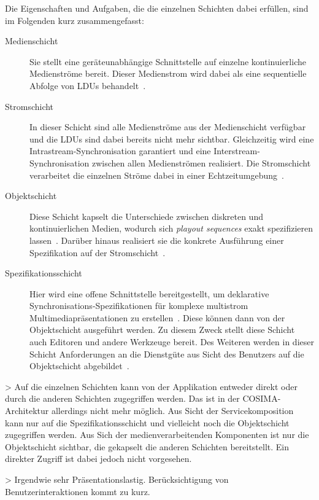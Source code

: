   Die Eigenschaften und Aufgaben, die die einzelnen Schichten dabei erfüllen, sind im Folgenden kurz zusammengefasst:
  
  \begin{description}
    \item[Medienschicht] Sie stellt eine geräteunabhängige Schnittstelle auf einzelne kontinuierliche Medienströme bereit. Dieser Medienstrom wird dabei als eine sequentielle Abfolge von LDUs behandelt~\citep[S. 603]{multimedia_technologie}.
    \item[Stromschicht] In dieser Schicht sind alle Medienströme aus der Medienschicht verfügbar und die LDUs sind dabei bereits nicht mehr sichtbar. Gleichzeitig wird eine Intrastream-Synchronisation garantiert und eine Interstream-Synchronisation zwischen allen Medienströmen realisiert. Die Stromschicht verarbeitet die einzelnen Ströme dabei in einer Echtzeitumgebung~\citep[S. 604]{multimedia_technologie}.
    \item[Objektschicht] Diese Schicht kapselt die Unterschiede zwischen diskreten und kontinuierlichen Medien, wodurch sich \emph{playout sequences} exakt spezifizieren lassen~\citep[S. 99]{meyer1993tms}. Darüber hinaus realisiert sie die konkrete Ausführung einer Spezifikation auf der Stromschicht~\citep[S. 605]{multimedia_technologie}.
    \item[Spezifikationsschicht] Hier wird eine offene Schnittstelle bereitgestellt, um deklarative Synchronisations-Spezifikationen für komplexe multistrom Multimediapräsentationen zu erstellen~\citep[S. 13]{blakowski1996mss}. Diese können dann von der Objektschicht ausgeführt werden. Zu diesem Zweck stellt diese Schicht auch Editoren und andere Werkzeuge bereit. Des Weiteren werden in dieser Schicht Anforderungen an die Dienstgüte aus Sicht des Benutzers auf die Objektschicht abgebildet~\citep[S. 607]{multimedia_technologie}.
  \end{description}
  
  > Auf die einzelnen Schichten kann von der Applikation entweder direkt oder durch die anderen Schichten zugegriffen werden. Das ist in der COSIMA-Architektur allerdings nicht mehr möglich. Aus Sicht der Servicekomposition kann nur auf die Spezifikationsschicht und vielleicht noch die Objektschicht zugegriffen werden. Aus Sich der medienverarbeitenden Komponenten ist nur die Objektschicht sichtbar, die gekapselt die anderen Schichten bereitstellt. Ein direkter Zugriff ist dabei jedoch nicht vorgesehen.
  
  > Irgendwie sehr Präsentationslastig. Berücksichtigung von Benutzerinteraktionen kommt zu kurz.

